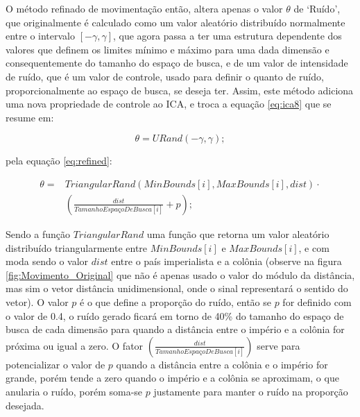 	O método refinado de movimentação então, altera apenas o valor \(\theta\) de ‘Ruído’, que originalmente é calculado como um valor aleatório distribuído normalmente entre o intervalo \(\left[-\gamma, \gamma\right]\), que agora passa a ter uma estrutura dependente dos valores que definem os limites mínimo e máximo para uma dada dimensão e consequentemente do tamanho do espaço de busca, e de um valor de intensidade de ruído, que é um valor de controle, usado para definir o quanto de ruído, proporcionalmente ao espaço de busca, se deseja ter. Assim, este método adiciona uma nova propriedade de controle ao ICA, e troca a equação \ref{eq:ica8} que se resume em:
    
    \[\theta = URand(-\gamma, \gamma);\]
    
pela equação \ref{eq:refined}:

\begin{equation}
\label{eq:refined}
\begin{split}
\theta = 
& TriangularRand(MinBounds[i], MaxBounds[i], dist) \cdot \\ 
& \left(\frac{dist}{TamanhoEspaçoDeBusca[i]} + p \right);
\end{split}
\end{equation}

Sendo a função \(TriangularRand\) uma função que retorna um valor aleatório distribuído triangularmente entre \(MinBounds[i]\) e \(MaxBounds[i]\), e com moda sendo o valor \(dist\) entre o país imperialista e a colônia (observe na figura \ref{fig:Movimento_Original} que não é apenas usado o valor do módulo da distância, mas sim o vetor distância unidimensional, onde o sinal representará o sentido do vetor). O valor \(p\) é o que define a proporção do ruído, então se \(p\) for definido com o valor de 0.4, o ruído gerado ficará em torno de 40\% do tamanho do espaço de busca de cada dimensão para quando a distância entre o império e a colônia for próxima ou igual a zero. O fator \(\left(\frac{dist}{TamanhoEspaçoDeBusca[i]}\right)\) serve para potencializar o valor de \(p\) quando a distância entre a colônia e o império for grande, porém tende a zero quando o império e a colônia se aproximam, o que anularia o ruído, porém soma-se \(p\) justamente para manter o ruído na proporção desejada.

